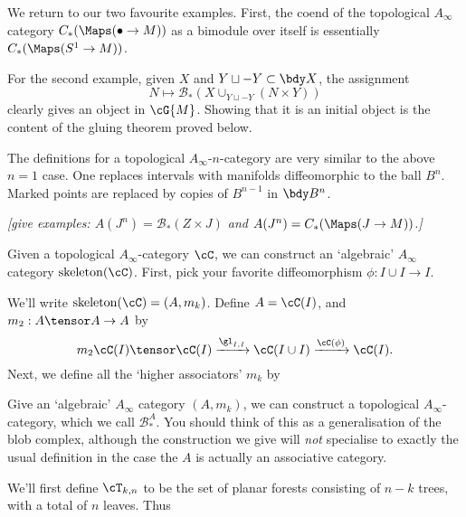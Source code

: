\documentclass[11pt,leqno]{amsart}
\def\bc{{\mathcal B}}
\def\du{\sqcup}
\def\sub{\subset}
\def\nn#1{{{\it \small [#1]}}}
\begin{document}
We return to our two favourite examples. First, the coend of the topological $A_\infty$ category $C_*(\Maps(\bullet \to M))$ as a bimodule over itself
is essentially $C_*(\Maps(S^1 \to M))$. \todo{}

For the second example, given $X$ and $Y\du -Y \sub \bdy X$, the assignment
$$N \mapsto \bc_*(X \cup_{Y\du -Y} (N\times Y))$$ clearly gives an object in $\cG{M}$.
Showing that it is an initial object is the content of the gluing theorem proved below.

The definitions for a topological $A_\infty$-$n$-category are very similar to the above
$n=1$ case.
One replaces intervals with manifolds diffeomorphic to the ball $B^n$.
Marked points are replaced by copies of $B^{n-1}$ in $\bdy B^n$.

\nn{give examples: $A(J^n) = \bc_*(Z\times J)$ and $A(J^n) = C_*(\Maps(J \to M))$.}




\newcommand{\skel}[1]{\operatorname{skeleton}(#1)}

Given a topological $A_\infty$-category $\cC$, we can construct an `algebraic' $A_\infty$ category $\skel{\cC}$. First, pick your
favorite diffeomorphism $\phi: I \cup I \to I$.
\begin{defn}
We'll write $\skel{\cC} = (A, m_k)$. Define $A = \cC(I)$, and $m_2 : A \tensor A \to A$ by
\begin{equation*}
m_2 \cC(I) \tensor \cC(I) \xrightarrow{\gl_{I,I}} \cC(I \cup I) \xrightarrow{\cC(\phi)} \cC(I).
\end{equation*}
Next, we define all the `higher associators' $m_k$ by
\todo{}
\end{defn}

Give an `algebraic' $A_\infty$ category $(A, m_k)$, we can construct a topological $A_\infty$-category, which we call $\bc_*^A$. You should
think of this as a generalisation of the blob complex, although the construction we give will \emph{not} specialise to exactly the usual definition
in the case the $A$ is actually an associative category.

We'll first define $\cT_{k,n}$ to be the set of planar forests consisting of $n-k$ trees, with a total of $n$ leaves. Thus
\begin{align*}
\end{align*}
\end{document}
